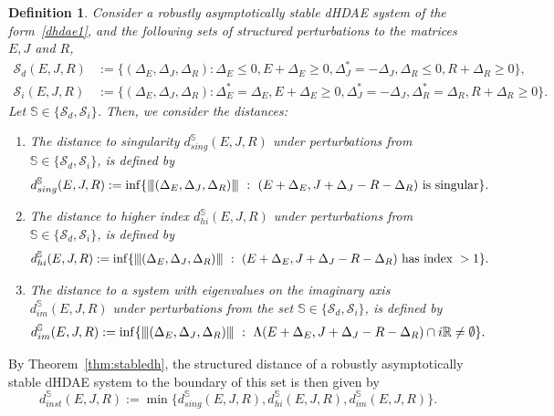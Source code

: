 \documentclass[11pt]{article}
\newtheorem{definition}[theorem]{Definition}
\newcommand{\nnrm}[1]{{\left\vert\kern-0.25ex\left\vert\kern-0.25ex\left\vert #1
		\right\vert\kern-0.25ex\right\vert\kern-0.25ex\right\vert}}
\begin{document}
\begin{definition}\label{def:distances}
	Consider a robustly  asymptotically stable dHDAE system of the form~\eqref{dhdae1}, and the following sets  of structured perturbations to the matrices $E, J$ and $R$,
	\begin{align}
		\mathcal S_d(E,J,R)&:= \{(\Delta_E,\Delta_J,\Delta_R):\Delta_E\leq 0, E+\Delta_E\geq 0, \Delta_J^*=-\Delta_J, \Delta_R\leq 0, R+\Delta_R\geq 0 \}, \label{set:Sd}\\
		\mathcal S_i(E,J,R)&:= \{(\Delta_E,\Delta_J,\Delta_R): \Delta_E^*=\Delta_E,E+\Delta_E\geq 0, \Delta_J^*=-\Delta_J, \Delta_R^*=\Delta_R, R+\Delta_R\geq 0 \}.\label{set:Si}
	\end{align}
	Let $\mathbb S\in \{\mathcal S_d,\mathcal S_i\}$. Then, we consider the  distances:
	\begin{enumerate}
		\item The distance to singularity $d_{sing}^{\mathbb S}(E,J,R)$ under perturbations from  $\mathbb S\in \{\mathcal S_d,\mathcal S_i\}$, is defined by
		\begin{equation}\label{def:dist-sing}
			d_{sing}^{\mathbb S}(E,J,R) := \inf\{\nnrm{(\Delta_E,\Delta_J,\Delta_R)}~:~(E+\Delta_E,J+\Delta_J-R-\Delta_R) \text{ is singular}\}.
		\end{equation}
		\item The distance to higher index $d_{hi}^{\mathbb S}(E,J,R)$ under perturbations from  $\mathbb S\in \{\mathcal S_d,\mathcal S_i\}$, is defined by
		\begin{equation}\label{def:dist-hi}
			d_{hi}^{\mathbb S}(E,J,R) := \inf\{\nnrm{(\Delta_E,\Delta_J,\Delta_R)}~:~(E+\Delta_E,J+\Delta_J-R-\Delta_R) \text{ has index }>1\}.
		\end{equation}
		\item The distance to a system with eigenvalues on the imaginary axis $d_{im}^{\mathbb S}(E,J,R)$ under perturbations from the set $\mathbb S\in \{\mathcal S_d,\mathcal S_i\}$, is defined by
		\begin{equation}\label{def:dist-im}
			d_{im}^{\mathbb S}(E,J,R) := \inf\{\nnrm{(\Delta_E,\Delta_J,\Delta_R)}~:~\Lambda(E+\Delta_E,J+\Delta_J-R-\Delta_R)\cap i\mathbb R \neq \emptyset \}.
		\end{equation}
	\end{enumerate}
\end{definition}

By  Theorem~\ref{thm:stabledh}, the structured distance  of a robustly asymptotically stable dHDAE system to the boundary of this set is then given by
%
\begin{equation*}\label{def:dist-inst}
	d_{inst}^{\mathbb S}(E,J,R):= \min \{d_{sing}^{\mathbb S}(E,J,R), d_{hi}^{\mathbb S}(E,J,R),d_{im}^{\mathbb S}(E,J,R)\}.
\end{equation*}
%
\end{document}
